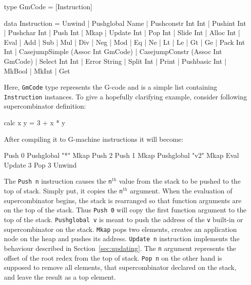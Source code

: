 \documentclass[12pt,a4paper]{report}
\begin{document}
\vspace*{0.2in}
\begin{code}[style=haskell]
  type GmCode = [Instruction]

  data Instruction = Unwind
                   | Pushglobal Name
                   | Pushconstr Int Int
                   | Pushint Int
                   | Pushchar Int
                   | Push Int
                   | Mkap
                   | Update Int
                   | Pop Int
                   | Slide Int
                   | Alloc Int
                   | Eval
                   | Add | Sub | Mul | Div | Neg | Mod
                   | Eq | Ne | Lt | Le | Gt | Ge
                   | Pack Int Int
                   | CasejumpSimple (Assoc Int GmCode)
                   | CasejumpConstr (Assoc Int GmCode)
                   | Select Int Int
                   | Error String
                   | Split Int
                   | Print
                   | Pushbasic Int
                   | MkBool
                   | MkInt
                   | Get
\end{code}

Here, \texttt{GmCode} type represents the G-code and is a simple list containing
\texttt{Instruction} instances. To give a hopefully clarifying example,
consider following supercombinator definition:

\vspace*{0.2in}
\begin{code}[style=haskell,label=lst:sc_to_compile,caption=Supercombinator to compile.]
  calc x y = 3 + x * y
\end{code}

After compiling it to G-machine instructions it will become:

\vspace*{0.2in}
\begin{code}[style=haskell,label=lst:gcode_supercombinator,caption={Compiled
  supercombinator body.}]
  Push 0
  Pushglobal "*"
  Mkap
  Push 2
  Push 1
  Mkap
  Pushglobal "v2"
  Mkap
  Eval
  Update 3
  Pop 3
  Unwind
\end{code}

The \texttt{Push n} instruction causes the \texttt{n}$^{th}$ value from the
stack to be pushed to the top of stack. Simply put, it copies the
\texttt{n}$^{th}$ argument. When the evaluation of supercombinator begins, the
stack is rearranged so that function arguments are on the top of the stack.
Thus \texttt{Push 0} will copy the first function argument to the top of the
stack. \texttt{Pushglobal v} is meant to push the address of the \texttt{v}
built-in or supercombinator on the stack. \texttt{Mkap} pops two elements,
creates an application node on the heap and pushes its address. \texttt{Update
n} instruction implements the behaviour described in
Section~\ref{sec:updating}. The \texttt{n} argument represents the offset of
the root redex from the top of stack. \texttt{Pop n} on the other hand is
supposed to remove all elements, that supercombinator declared on the stack,
and leave the result as a top element.
\end{document}
